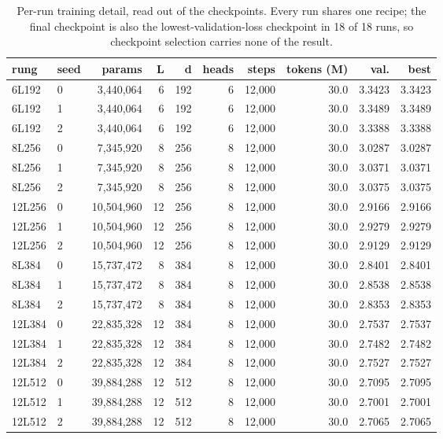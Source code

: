 \documentclass[11pt]{article}
\begin{document}
\begin{table}[htbp]
\centering\small
\caption{Per-run training detail, read out of the checkpoints. Every run shares one recipe; the final checkpoint is also the lowest-validation-loss checkpoint in 18 of 18 runs, so checkpoint selection carries none of the result.}
\label{tab:s-training}
\begin{tabular}{llrrrrrrrr}
\toprule
rung & seed & params & L & d & heads & steps & tokens (M) & val. & best \\
\midrule
6L192 & 0 & 3,440,064 & 6 & 192 & 6 & 12,000 & 30.0 & 3.3423 & 3.3423 \\
6L192 & 1 & 3,440,064 & 6 & 192 & 6 & 12,000 & 30.0 & 3.3489 & 3.3489 \\
6L192 & 2 & 3,440,064 & 6 & 192 & 6 & 12,000 & 30.0 & 3.3388 & 3.3388 \\
8L256 & 0 & 7,345,920 & 8 & 256 & 8 & 12,000 & 30.0 & 3.0287 & 3.0287 \\
8L256 & 1 & 7,345,920 & 8 & 256 & 8 & 12,000 & 30.0 & 3.0371 & 3.0371 \\
8L256 & 2 & 7,345,920 & 8 & 256 & 8 & 12,000 & 30.0 & 3.0375 & 3.0375 \\
12L256 & 0 & 10,504,960 & 12 & 256 & 8 & 12,000 & 30.0 & 2.9166 & 2.9166 \\
12L256 & 1 & 10,504,960 & 12 & 256 & 8 & 12,000 & 30.0 & 2.9279 & 2.9279 \\
12L256 & 2 & 10,504,960 & 12 & 256 & 8 & 12,000 & 30.0 & 2.9129 & 2.9129 \\
8L384 & 0 & 15,737,472 & 8 & 384 & 8 & 12,000 & 30.0 & 2.8401 & 2.8401 \\
8L384 & 1 & 15,737,472 & 8 & 384 & 8 & 12,000 & 30.0 & 2.8538 & 2.8538 \\
8L384 & 2 & 15,737,472 & 8 & 384 & 8 & 12,000 & 30.0 & 2.8353 & 2.8353 \\
12L384 & 0 & 22,835,328 & 12 & 384 & 8 & 12,000 & 30.0 & 2.7537 & 2.7537 \\
12L384 & 1 & 22,835,328 & 12 & 384 & 8 & 12,000 & 30.0 & 2.7482 & 2.7482 \\
12L384 & 2 & 22,835,328 & 12 & 384 & 8 & 12,000 & 30.0 & 2.7527 & 2.7527 \\
12L512 & 0 & 39,884,288 & 12 & 512 & 8 & 12,000 & 30.0 & 2.7095 & 2.7095 \\
12L512 & 1 & 39,884,288 & 12 & 512 & 8 & 12,000 & 30.0 & 2.7001 & 2.7001 \\
12L512 & 2 & 39,884,288 & 12 & 512 & 8 & 12,000 & 30.0 & 2.7065 & 2.7065 \\
\bottomrule
\end{tabular}
\end{table}
\end{document}
